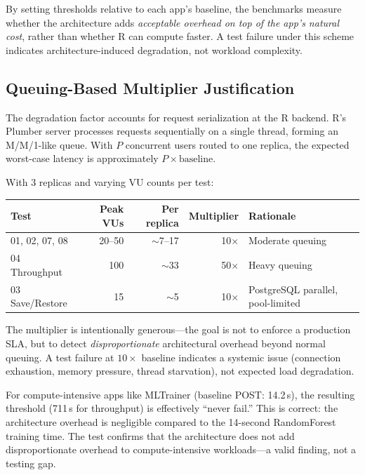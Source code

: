 \documentclass[11pt,a4paper]{article}
\begin{document}
\noindent By setting thresholds relative to each app's baseline, the
benchmarks measure whether the architecture adds \emph{acceptable
overhead on top of the app's natural cost}, rather than whether R
can compute faster. A test failure under this scheme indicates
architecture-induced degradation, not workload complexity.

\subsection{Queuing-Based Multiplier Justification}

The degradation factor accounts for request serialization at the R
backend. R's Plumber server processes requests sequentially on a single
thread, forming an M/M/1-like queue. With $P$ concurrent users routed
to one replica, the expected worst-case latency is approximately
$P \times \text{baseline}$.

With 3 replicas and varying VU counts per test:

\begin{center}
\begin{tabular}{lrrrl}
\toprule
\textbf{Test} & \textbf{Peak VUs} & \textbf{Per replica} & \textbf{Multiplier} & \textbf{Rationale} \\
\midrule
01, 02, 07, 08 & 20--50 & $\sim$7--17 & 10$\times$ & Moderate queuing \\
04 Throughput   & 100    & $\sim$33    & 50$\times$ & Heavy queuing \\
03 Save/Restore & 15     & $\sim$5     & 10$\times$ & PostgreSQL parallel, pool-limited \\
\bottomrule
\end{tabular}
\end{center}

\noindent The multiplier is intentionally generous---the goal is not to
enforce a production SLA, but to detect \emph{disproportionate}
architectural overhead beyond normal queuing. A test failure at
$10\times$ baseline indicates a systemic issue (connection exhaustion,
memory pressure, thread starvation), not expected load degradation.

For compute-intensive apps like MLTrainer (baseline POST: 14.2\,s),
the resulting threshold (711\,s for throughput) is effectively
``never fail.'' This is correct: the architecture overhead is
negligible compared to the 14-second RandomForest training time.
The test confirms that the architecture does not add disproportionate
overhead to compute-intensive workloads---a valid finding, not a
testing gap.
\end{document}
